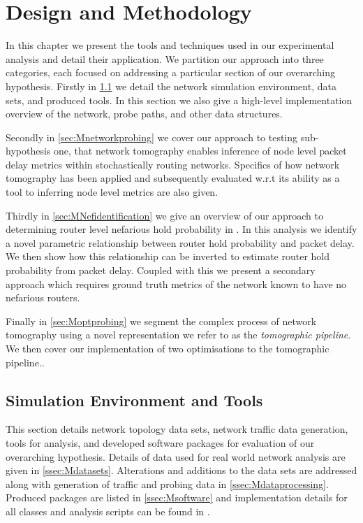 \chapter{Design and Methodology}
\label{cha:methodology}
In this chapter we present the tools and techniques used in our experimental analysis and detail their application. We partition our approach into three categories, each focused on addressing a particular section of our overarching hypothesis. Firstly in \cref{sec:Msimenvironment} we detail the network simulation environment, data sets, and produced tools. In this section we also give a high-level implementation overview of the network, probe paths, and other data structures.\par
Secondly in \cref{sec:Mnetworkprobing} we cover our approach to testing sub-hypothesis one, that network tomography enables inference of node level packet delay metrics within stochastically routing networks. Specifics of how network tomography has been applied and subsequently evaluated w.r.t its ability as a tool to inferring node level metrics are also given.\par
Thirdly in \cref{sec:MNefidentification} we give an overview of our approach to determining router level nefarious hold probability in . In this analysis we identify a novel parametric relationship between router hold probability and packet delay. We then show how this relationship can be inverted to estimate router hold probability from packet delay. Coupled with this we present a secondary approach which requires ground truth metrics of the network known to have no nefarious routers.\par
Finally in \cref{sec:Moptprobing} we segment the complex process of network tomography using a novel representation we refer to as the \textit{tomographic pipeline}. We then cover our implementation of two optimisations to the tomographic pipeline..

\section{Simulation Environment and Tools}
\label{sec:Msimenvironment}
This section details network topology data sets, network traffic data generation, tools for analysis, and developed software packages for evaluation of our overarching hypothesis. Details of data used for real world network analysis are given in \cref{ssec:Mdatasets}. Alterations and additions to the data sets are addressed along with generation of traffic and probing data in \cref{ssec:Mdataprocessing}. Produced packages are listed in \cref{ssec:Msoftware} and implementation details for all classes and analysis scripts can be found in \cite{sylvester_millar_real_2021}.

